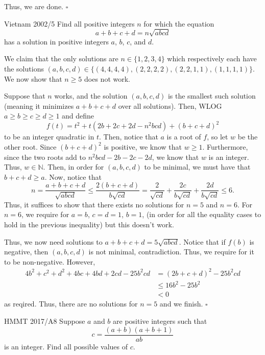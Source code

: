 \documentclass{article}
\begin{document}
Thus, we are done. $\square$

\newpage

\begin{problem}[4.9.15]{Vietnam 2002/5}
Find all positive integers $n$ for which the equation \[a+b+c+d = n\sqrt{abcd}\] has a solution in positive integers $a$, $b$, $c$, and $d$.
\end{problem}

We claim that the only solutions are $n \in \boxed{\{1, 2, 3, 4\}}$ which respectively each have the solutions $(a, b, c, d) \in \{(4, 4, 4, 4), (2, 2, 2, 2), (2, 2, 1, 1), (1, 1, 1, 1)\}$. We now show that $n \ge 5$ does not work.

Suppose that $n$ works, and the solution $(a, b, c, d)$ is the smallest such solution (meaning it minimizes $a+b+c+d$ over all solutions). Then, WLOG $a \ge b \ge c \ge d \ge 1$ and define \[f(t) = t^2+t(2b+2c+2d-n^2bcd)+(b+c+d)^2\] to be an integer quadratic in $t$. Then, notice that $a$ is a root of $f$, so let $w$ be the other root. Since $(b+c+d)^2$ is positive, we know that $w \ge 1$. Furthermore, since the two roots add to $n^2bcd-2b-2c-2d$, we know that $w$ is an integer. Thus, $w \in \mathbb{N}$. Then, in order for $(a, b, c, d)$ to be minimal, we must have that $b+c+d \ge a$. Now, notice that \[n = \dfrac{a+b+c+d}{\sqrt{abcd}} \le \dfrac{2(b+c+d)}{b\sqrt{cd}} = \dfrac{2}{\sqrt{cd}}+\dfrac{2c}{b\sqrt{cd}}+\dfrac{2d}{b\sqrt{cd}} \le 6.\] Thus, it suffices to show that there exists no solutions for $n = 5$ and $n = 6$. For $n = 6$, we require for $a = b$, $c = d = 1$, $b = 1$, (in order for all the equality cases to hold in the previous inequality) but this doesn't work.

Thus, we now need solutions to $a+b+c+d = 5\sqrt{abcd}$. Notice that if $f(b)$ is negative, then $(a, b, c, d)$ is not minimal, contradiction. Thus, we require for it to be non-negative. However,
\begin{align*}
4b^2+c^2+d^2+4bc+4bd+2cd-25b^2cd &= (2b+c+d)^2-25b^2cd\\
&\le 16b^2-25b^2 \\
&<0
\end{align*}
as reqired. Thus, there are no solutions for $n = 5$ and we finish. $\square$

\begin{problem}[4.9.16]{HMMT 2017/A8}
Suppose $a$ and $b$ are positive integers such that \[c = \dfrac{(a+b)(a+b+1)}{ab}\] is an integer. Find all possible values of $c$.
\end{problem}
\end{document}
